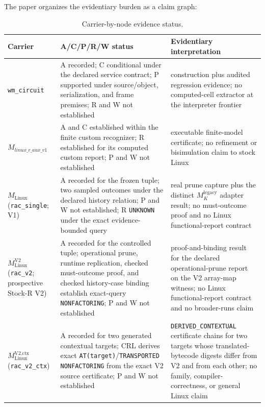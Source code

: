 \documentclass[conference]{IEEEtran}
\begin{document}
The paper organizes the evidentiary burden as a claim graph:

\begin{table}[t]
\caption{Carrier-by-node evidence status.}
\label{tab:claim-graph}
\centering
\small
\setlength{\tabcolsep}{3pt}
\begin{tabularx}{\textwidth}{@{}p{}p{}Y@{}}
\toprule
Carrier & A/C/P/R/W status & Evidentiary interpretation \\
\midrule
\texttt{wm\_circuit} & A recorded; C conditional under the declared service contract; P supported under source/object, serialization, and frame premises; R and W not established & construction plus audited regression evidence; no computed-cell extractor at the interpreter frontier \\
$M_{\mathit{linux\_r\_aux\_v1}}$ & A and C established within the finite custom recognizer; R established for its computed custom report; P and W not established & executable finite-model certificate; no refinement or bisimulation claim to stock Linux \\
$M_{\mathrm{Linux}}$ (\texttt{rac\_single}; V1) & A recorded for the frozen tuple; two sampled outcomes under the declared history relation; P and W not established; R \texttt{UNKNOWN} under the exact evidence-bounded query & real prune capture plus the distinct $M_K^{\mathrm{legacy}}$ adapter result; no must-outcome proof and no Linux functional-report contract \\
$M_{\mathrm{Linux}}^{\mathrm{V2}}$ (\texttt{rac\_v2}; prospective Stock-R V2) & A recorded for the controlled tuple; operational prune, runtime replication, checked must-outcome proof, and checked history-case binding establish exact-query \texttt{NONFACTORING}; P and W not established & proof-and-binding result for the declared operational-prune report on the V2 array-map witness; no Linux functional-report contract and no broader-runs claim \\
$M_{\mathrm{Linux}}^{\mathrm{V2.ctx}}$ (\texttt{rac\_v2\_ctx}) & A recorded for two generated contextual targets; CRL derives exact \texttt{AT(target)}/\texttt{TRANSPORTED} \texttt{NONFACTORING} from the exact V2 source certificate; P and W not established & \texttt{DERIVED\_CONTEXTUAL} certificate chains for two targets whose translated-bytecode digests differ from V2 and from each other; no family, compiler-correctness, or general Linux claim \\
\bottomrule
\end{tabularx}
\end{table}
\end{document}
